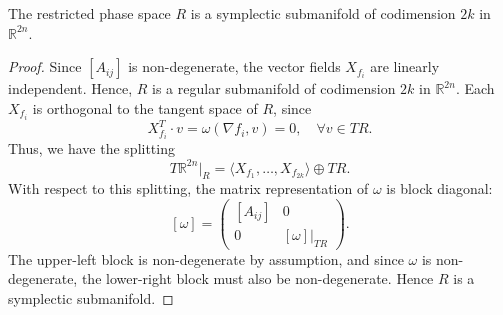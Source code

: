 \documentclass[10pt,a4paper]{amsart}
\begin{document}
\begin{lemma}
The restricted phase space $R$ is a symplectic submanifold of codimension $2k$ in $\mathbb{R}^{2n}$.
\end{lemma}

\begin{proof}
Since $[A_{ij}]$ is non-degenerate, the vector fields $X_{f_i}$ are linearly independent. Hence, $R$ is a regular submanifold of codimension $2k$ in $\mathbb{R}^{2n}$. 
Each $X_{f_i}$ is orthogonal to the tangent space of $R$, since
\[
X_{f_i}^T \cdot v = \omega(\nabla f_i, v) = 0, \quad \forall v \in TR.
\]
Thus, we have the splitting
\[
T\mathbb{R}^{2n}|_R = \langle X_{f_1}, \ldots, X_{f_{2k}} \rangle \oplus TR.
\]
With respect to this splitting, the matrix representation of $\omega$ is block diagonal:
\[
[\omega] =
\begin{pmatrix}
[A_{ij}] & 0 \\
0 & [\omega]|_{T R}
\end{pmatrix}.
\]
The upper-left block is non-degenerate by assumption, and since $\omega$ is non-degenerate, the lower-right block must also be non-degenerate. Hence $R$ is a symplectic submanifold.
\end{proof}
\end{document}
